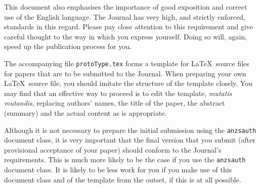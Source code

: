\documentclass[times, doublespace]{anzsauth}
\begin{document}
This document also emphasises the importance of good exposition and
correct use of the English language.  The Journal has very high,
and strictly enforced, standards in this regard.  Please pay close
attention to this requirement and give careful thought to the way
in which you express yourself.  Doing so will, again, speed up the
publication process for you.

The accompanying file \texttt{protoType.tex} forms a template for
\LaTeX\ source files for papers that are to be submitted to the
Journal.  When preparing your own \LaTeX\ source file, you should
imitate the structure of the template closely.  You may find that
an effective way to proceed is to edit the template, \textit{mutatis
mutandis}, replacing authors' names, the title of the paper,
the abstract (summary) and the actual content as is appropriate.

Although it is not necessary to prepare the initial submission using
the \texttt{anzsauth} document class, it is very important that
the final version that you submit (after provisional acceptance of
your paper) should conform to the Journal's requirements.  This is
much more likely to be the case if you use the \texttt{anzsauth}
document class.  It is likely to be less work for you if you make
use of this document class and of the template from the outset,
if this is at all possible.

\newpage


\end{document}
